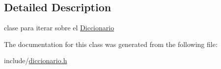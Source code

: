 \subsection{Detailed Description}
clase para iterar sobre el \mbox{\hyperlink{classDiccionario}{Diccionario}} 

The documentation for this class was generated from the following file\+:\begin{DoxyCompactItemize}
\item 
include/\mbox{\hyperlink{diccionario_8h}{diccionario.\+h}}\end{DoxyCompactItemize}

